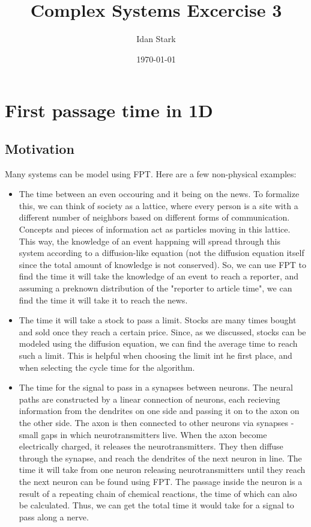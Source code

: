 \documentclass{article}
\title{Complex Systems Excercise 3}
\author{Idan Stark}
\date{\today}
\begin{document}
\maketitle

\section{First passage time in 1D}
\subsection{Motivation}
Many systems can be model using FPT. Here are a few non-physical examples:
\begin{itemize}
    \item The time between an even occouring and it being on the news.
    \newline
    To formalize this, we can think of society as a lattice, where every person is a site with a different number of neighbors based on different forms of communication. Concepts and pieces of information act as particles moving in this lattice. This way, the knowledge of an event happning will spread through this system according to a diffusion-like equation (not the diffusion equation itself since the total amount of knowledge is not conserved). So, we can use FPT to find the time it will take the knowledge of an event to reach a reporter, and assuming a preknown distribution of the "reporter to article time", we can find the time it will take it to reach the news.
    \item The time it will take a stock to pass a limit.
    \newline
    Stocks are many times bought and sold once they reach a certain price. Since, as we discussed, stocks can be modeled using the diffusion equation, we can find the average time to reach such a limit. This is helpful when choosing the limit int he first place, and when selecting the cycle time for the algorithm.
    \item The time for the signal to pass in a synapses between neurons.
    \newline
    The neural paths are constructed by a linear connection of neurons, each recieving information from the dendrites on one side and passing it on to the axon on the other side. The axon is then connected to other neurons via synapses - small gaps in which neurotransmitters live. When the axon become electrically charged, it releases the neurotransmitters. They then diffuse through the synapse, and reach the dendrites of the next neuron in line. The time it will take from one neuron releasing neurotransmitters until they reach the next neuron can be found using FPT. The passage inside the neuron is a result of a repeating chain of chemical reactions, the time of which can also be calculated. Thus, we can get the total time it would take for a signal to pass along a nerve.
\end{itemize}
\end{document}
